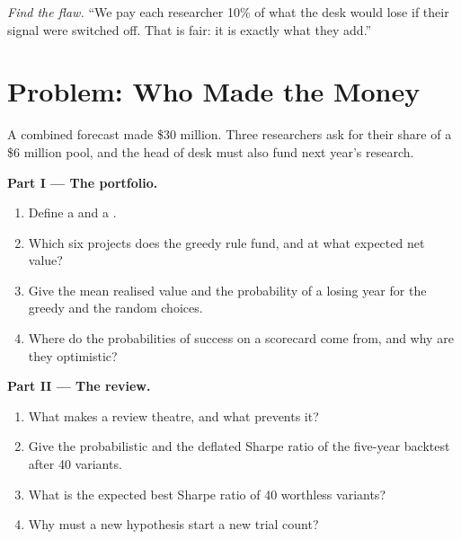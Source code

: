 \begin{exercise}[$\star\star\star$]\label{exo:fm:managing-researchers-traders-and-engineers:8}
\emph{Find the flaw.} ``We pay each researcher 10\% of what the desk would lose if their signal were switched off. That is fair: it is exactly
what they add.''
\end{exercise}

\section{Problem: Who Made the Money}

\begin{problem}\label{pb:fm:managing-researchers-traders-and-engineers:1}
A combined forecast made \$30 million. Three researchers ask for their share of a \$6 million pool, and the head of desk must also fund next year's
research.

\medskip\noindent\textbf{Part I --- The portfolio.}
\begin{enumerate}
\item Define a  and a .
\item Which six projects does the greedy rule fund, and at what expected net value?
\item Give the mean realised value and the probability of a losing year for the greedy and the random choices.
\item Where do the probabilities of success on a scorecard come from, and why are they optimistic?
\end{enumerate}

\medskip\noindent\textbf{Part II --- The review.}
\begin{enumerate}[resume]
\item What makes a review theatre, and what prevents it?
\item Give the probabilistic and the deflated Sharpe ratio of the five-year backtest after 40 variants.
\item What is the expected best Sharpe ratio of 40 worthless variants?
\item Why must a new hypothesis start a new trial count?
\end{enumerate}


\end{problem}
